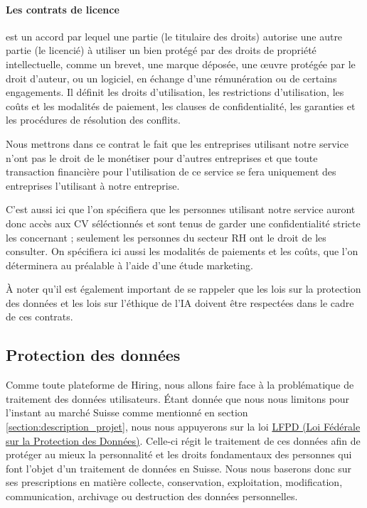 \paragraph{Les contrats de licence} est un accord par lequel une partie (le titulaire des droits) autorise une autre partie (le licencié) à utiliser un bien protégé par des droits de propriété intellectuelle, comme un brevet, une marque déposée, une œuvre protégée par le droit d'auteur, ou un logiciel, en échange d'une rémunération ou de certains engagements. Il définit les droits d'utilisation, les restrictions d'utilisation, les coûts et les modalités de paiement, les clauses de confidentialité, les garanties et les procédures de résolution des conflits.

Nous mettrons dans ce contrat le fait que les entreprises utilisant notre service n'ont pas le droit de le monétiser pour d'autres entreprises et que toute transaction financière pour l'utilisation de ce service se fera uniquement des entreprises l'utilisant à notre entreprise. \newline

C'est aussi ici que l'on spécifiera que les personnes utilisant notre service auront donc accès aux CV séléctionnés et sont tenus de garder une confidentialité stricte les concernant ; seulement les personnes du secteur RH ont le droit de les consulter. On spécifiera ici aussi les modalités de paiements et les coûts, que l'on déterminera au préalable à l'aide d'une étude marketing.

À noter qu'il est également important de se rappeler que les lois sur la protection des données et les lois sur l'éthique de l'IA doivent être respectées dans le cadre de ces contrats.



\subsection{Protection des données}\label{subsection:protection_des_donnees}

 Comme toute plateforme de Hiring, nous allons faire face à la problématique de traitement des données utilisateurs. Étant donnée que nous nous limitons pour l'instant au marché Suisse comme mentionné en section \ref{section:description_projet}, nous nous appuyerons sur la loi \href{https://www.fedlex.admin.ch/eli/cc/1993/1945_1945_1945/fr}{LFPD (Loi Fédérale
sur la Protection des Données)}. Celle-ci régit le traitement de ces données afin de protéger au mieux la personnalité et les droits fondamentaux des personnes qui font l’objet d’un traitement de données en Suisse. \newline 
Nous nous baserons donc sur ses prescriptions en matière collecte, conservation, exploitation, modification,  communication, archivage ou destruction des données personnelles.\newline

